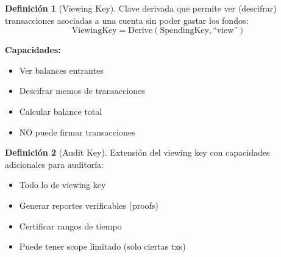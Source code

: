 \documentclass[11pt,a4paper,twoside]{book}
\theoremstyle{definition}
\newtheorem{definition}{Definición}[chapter]
\theoremstyle{remark}
\begin{document}
\begin{definition}[Viewing Key]
Clave derivada que permite ver (descifrar) transacciones asociadas a una cuenta sin poder gastar los fondos:
\[
\text{ViewingKey} = \text{Derive}(\text{SpendingKey}, \text{``view''})
\]

\textbf{Capacidades:}
\begin{itemize}
    \item Ver balances entrantes
    \item Descifrar memos de transacciones
    \item Calcular balance total
    \item NO puede firmar transacciones
\end{itemize}
\end{definition}

\begin{definition}[Audit Key]
Extensión del viewing key con capacidades adicionales para auditoría:
\begin{itemize}
    \item Todo lo de viewing key
    \item Generar reportes verificables (proofs)
    \item Certificar rangos de tiempo
    \item Puede tener scope limitado (solo ciertas txs)
\end{itemize}
\end{definition}
\end{document}
